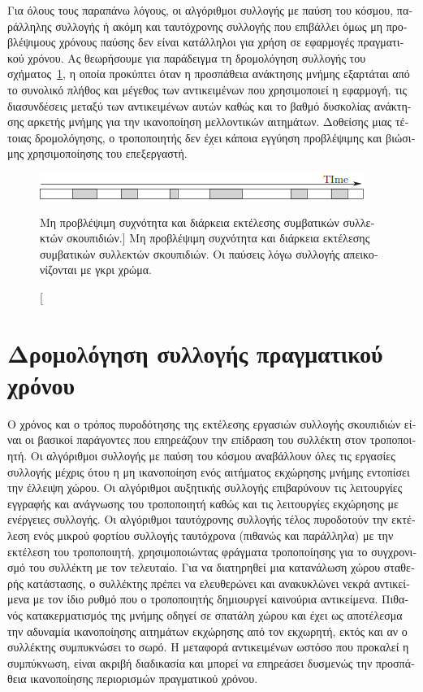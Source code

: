 \begin{greek}
Για όλους τους παραπάνω λόγους, οι αλγόριθμοι συλλογής με
παύση του κόσμου, παράλληλης συλλογής ή ακόμη και ταυτόχρονης
συλλογής που επιβάλλει όμως μη προβλέψιμους χρόνους παύσης
δεν είναι κατάλληλοι για χρήση σε εφαρμογές πραγματικού
χρόνου. Ας θεωρήσουμε για παράδειγμα τη δρομολόγηση συλλογής
του σχήματος~\ref{fig:rt_1}, η οποία προκύπτει όταν η προσπάθεια
ανάκτησης μνήμης εξαρτάται από το συνολικό πλήθος και μέγεθος
των αντικειμένων που χρησιμοποιεί η εφαρμογή, τις διασυνδέσεις
μεταξύ των αντικειμένων αυτών καθώς και το βαθμό δυσκολίας ανάκτησης
αρκετής μνήμης για την ικανοποίηση μελλοντικών αιτημάτων. Δοθείσης
μιας τέτοιας δρομολόγησης, ο τροποποιητής δεν έχει κάποια εγγύηση
προβλέψιμης και βιώσιμης χρησιμοποίησης του επεξεργαστή.

\begin{figure}
  \centering
  \includegraphics{figures/rt_1}
  \caption
    [Μη προβλέψιμη συχνότητα και διάρκεια εκτέλεσης συμβατικών
     συλλεκτών σκουπιδιών.]
    {Μη προβλέψιμη συχνότητα και διάρκεια εκτέλεσης συμβατικών
     συλλεκτών σκουπιδιών. Οι παύσεις λόγω συλλογής απεικονίζονται
     με γκρι χρώμα.}
  \label{fig:rt_1} 
\end{figure}

\section{Δρομολόγηση συλλογής πραγματικού χρόνου}
Ο χρόνος και ο τρόπος πυροδότησης της εκτέλεσης εργασιών συλλογής
σκουπιδιών είναι οι βασικοί παράγοντες που επηρεάζουν την επίδραση
του συλλέκτη στον τροποποιητή. Οι αλγόριθμοι συλλογής με παύση
του κόσμου αναβάλλουν όλες τις εργασίες συλλογής μέχρις ότου η
μη ικανοποίηση ενός αιτήματος εκχώρησης μνήμης εντοπίσει την
έλλειψη χώρου. Οι αλγόριθμοι αυξητικής συλλογής επιβαρύνουν
τις λειτουργίες εγγραφής και ανάγνωσης του τροποποιητή καθώς
και τις λειτουργίες εκχώρησης με ενέργειες συλλογής. Οι αλγόριθμοι
ταυτόχρονης συλλογής τέλος πυροδοτούν την εκτέλεση ενός μικρού
φορτίου συλλογής ταυτόχρονα (πιθανώς και παράλληλα) με την
εκτέλεση του τροποποιητή, χρησιμοποιώντας φράγματα τροποποίησης
για το συγχρονισμό του συλλέκτη με τον τελευταίο. Για να διατηρηθεί
μια κατανάλωση χώρου σταθερής κατάστασης, ο συλλέκτης πρέπει
να ελευθερώνει και ανακυκλώνει νεκρά αντικείμενα με τον ίδιο
ρυθμό που ο τροποποιητής δημιουργεί καινούρια αντικείμενα.
Πιθανός κατακερματισμός της μνήμης οδηγεί σε σπατάλη χώρου και
έχει ως αποτέλεσμα την αδυναμία ικανοποίησης αιτημάτων εκχώρησης
από τον εκχωρητή, εκτός και αν ο συλλέκτης συμπυκνώσει το
σωρό. Η μεταφορά αντικειμένων ωστόσο που προκαλεί η συμπύκνωση,
είναι ακριβή διαδικασία και μπορεί να επηρεάσει δυσμενώς την
προσπάθεια ικανοποίησης περιορισμών πραγματικού χρόνου.


\end{greek}
